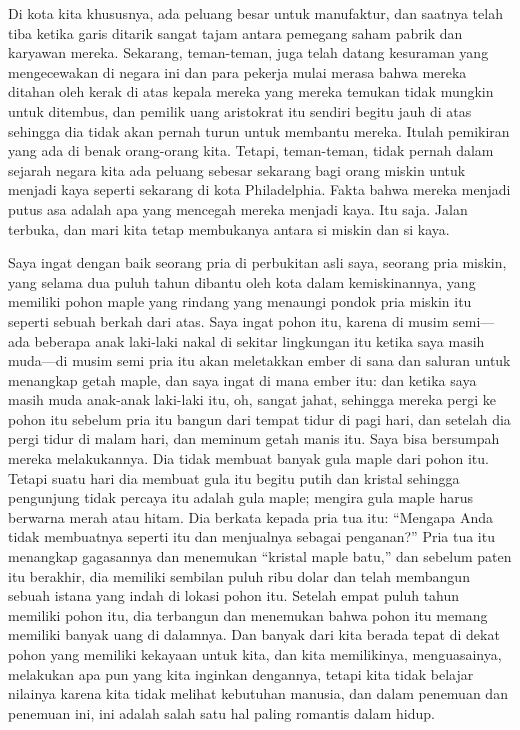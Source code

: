 \documentclass[
  letterpaper,
  DIV=11,
  numbers=noendperiod]{scrreprt}
\begin{document}
Di kota kita khususnya, ada peluang besar untuk manufaktur, dan saatnya
telah tiba ketika garis ditarik sangat tajam antara pemegang saham
pabrik dan karyawan mereka. Sekarang, teman-teman, juga telah datang
kesuraman yang mengecewakan di negara ini dan para pekerja mulai merasa
bahwa mereka ditahan oleh kerak di atas kepala mereka yang mereka
temukan tidak mungkin untuk ditembus, dan pemilik uang aristokrat itu
sendiri begitu jauh di atas sehingga dia tidak akan pernah turun untuk
membantu mereka. Itulah pemikiran yang ada di benak orang-orang kita.
Tetapi, teman-teman, tidak pernah dalam sejarah negara kita ada peluang
sebesar sekarang bagi orang miskin untuk menjadi kaya seperti sekarang
di kota Philadelphia. Fakta bahwa mereka menjadi putus asa adalah apa
yang mencegah mereka menjadi kaya. Itu saja. Jalan terbuka, dan mari
kita tetap membukanya antara si miskin dan si kaya.

Saya ingat dengan baik seorang pria di perbukitan asli saya, seorang
pria miskin, yang selama dua puluh tahun dibantu oleh kota dalam
kemiskinannya, yang memiliki pohon maple yang rindang yang menaungi
pondok pria miskin itu seperti sebuah berkah dari atas. Saya ingat pohon
itu, karena di musim semi---ada beberapa anak laki-laki nakal di sekitar
lingkungan itu ketika saya masih muda---di musim semi pria itu akan
meletakkan ember di sana dan saluran untuk menangkap getah maple, dan
saya ingat di mana ember itu: dan ketika saya masih muda anak-anak
laki-laki itu, oh, sangat jahat, sehingga mereka pergi ke pohon itu
sebelum pria itu bangun dari tempat tidur di pagi hari, dan setelah dia
pergi tidur di malam hari, dan meminum getah manis itu. Saya bisa
bersumpah mereka melakukannya. Dia tidak membuat banyak gula maple dari
pohon itu. Tetapi suatu hari dia membuat gula itu begitu putih dan
kristal sehingga pengunjung tidak percaya itu adalah gula maple; mengira
gula maple harus berwarna merah atau hitam. Dia berkata kepada pria tua
itu: ``Mengapa Anda tidak membuatnya seperti itu dan menjualnya sebagai
penganan?'' Pria tua itu menangkap gagasannya dan menemukan ``kristal
maple batu,'' dan sebelum paten itu berakhir, dia memiliki sembilan
puluh ribu dolar dan telah membangun sebuah istana yang indah di lokasi
pohon itu. Setelah empat puluh tahun memiliki pohon itu, dia terbangun
dan menemukan bahwa pohon itu memang memiliki banyak uang di dalamnya.
Dan banyak dari kita berada tepat di dekat pohon yang memiliki kekayaan
untuk kita, dan kita memilikinya, menguasainya, melakukan apa pun yang
kita inginkan dengannya, tetapi kita tidak belajar nilainya karena kita
tidak melihat kebutuhan manusia, dan dalam penemuan dan penemuan ini,
ini adalah salah satu hal paling romantis dalam hidup.
\end{document}
